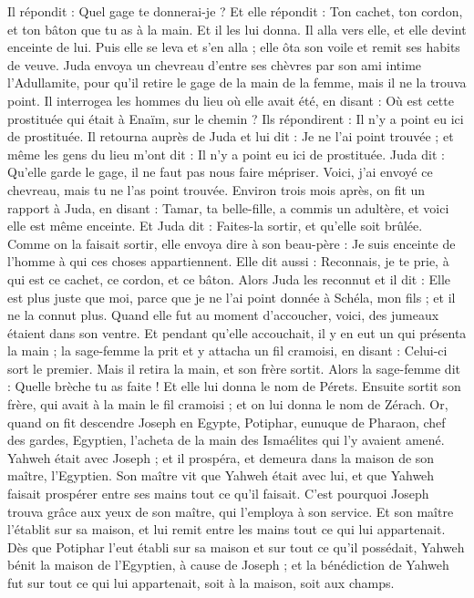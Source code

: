 \begin{multicols}{2}
Il répondit : Quel gage te donnerai-je ? Et elle répondit : Ton cachet, ton cordon, et ton bâton que tu as à la main. Et il les lui donna. Il alla vers elle, et elle devint enceinte de lui.
Puis elle se leva et s'en alla ; elle ôta son voile et remit ses habits de veuve.
Juda envoya un chevreau d'entre ses chèvres par son ami intime l’Adullamite, pour qu'il retire le gage de la main de la femme, mais il ne la trouva point.
Il interrogea les hommes du lieu où elle avait été, en disant : Où est cette prostituée qui était à Enaïm, sur le chemin ? Ils répondirent : Il n'y a point eu ici de prostituée.
Il retourna auprès de Juda et lui dit : Je ne l'ai point trouvée ; et même les gens du lieu m'ont dit : Il n'y a point eu ici de prostituée.
Juda dit : Qu'elle garde le gage, il ne faut pas nous faire mépriser. Voici, j'ai envoyé ce chevreau, mais tu ne l'as point trouvée.
Environ trois mois après, on fit un rapport à Juda, en disant : Tamar, ta belle-fille, a commis un adultère, et voici elle est même enceinte. Et Juda dit : Faites-la sortir, et qu'elle soit brûlée.
Comme on la faisait sortir, elle envoya dire à son beau-père : Je suis enceinte de l'homme à qui ces choses appartiennent. Elle dit aussi : Reconnais, je te prie, à qui est ce cachet, ce cordon, et ce bâton.
Alors Juda les reconnut et il dit : Elle est plus juste que moi, parce que je ne l'ai point donnée à Schéla, mon fils ; et il ne la connut plus.
Quand elle fut au moment d'accoucher, voici, des jumeaux étaient dans son ventre.
Et pendant qu’elle accouchait, il y en eut un qui présenta la main ; la sage-femme la prit et y attacha un fil cramoisi, en disant : Celui-ci sort le premier.
Mais il retira la main, et son frère sortit. Alors la sage-femme dit : Quelle brèche tu as faite ! Et elle lui donna le nom de Pérets.
Ensuite sortit son frère, qui avait à la main le fil cramoisi ; et on lui donna le nom de Zérach.
\VerseOne{}Or, quand on fit descendre Joseph en Egypte, Potiphar, eunuque de Pharaon, chef des gardes, Egyptien, l'acheta de la main des Ismaélites qui l'y avaient amené.
Yahweh était avec Joseph ; et il prospéra, et demeura dans la maison de son maître,  l’Egyptien.
Son maître vit que Yahweh était avec lui, et que Yahweh faisait prospérer entre ses mains tout ce qu'il faisait.
C'est pourquoi Joseph trouva grâce aux yeux de son maître, qui l’employa à son service. Et son maître l'établit sur sa maison, et lui remit entre les mains tout ce qui lui appartenait.
Dès que Potiphar l’eut établi sur sa maison et sur tout ce qu’il possédait, Yahweh bénit la maison de l’Egyptien, à cause de Joseph ; et la bénédiction de Yahweh fut sur tout ce qui lui appartenait, soit à la maison, soit aux champs.

\end{multicols}
